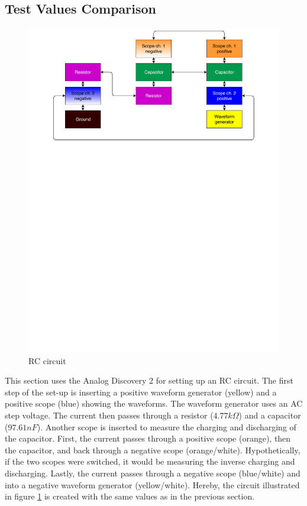 \subsection{Test Values Comparison}
\begin{figure}[H]
	\center
		\includegraphics[clip, trim=0cm 18cm 0cm 0cm, scale=0.6]{fig/img/test_circuit_1}
	\caption{RC circuit}
	\label{rc_flow}
\end{figure}
This section uses the Analog Discovery 2 for setting up an RC circuit. The first step of the set-up is inserting a positive waveform generator (yellow) and a positive scope (blue) showing the waveforms. The waveform generator uses an AC step voltage. The current then passes through a resistor ($4.77 k\Omega$) and a capacitor ($97.61 nF$). Another scope is inserted to measure the charging and discharging of the capacitor. First, the current passes through a positive scope (orange), then the capacitor, and back through a negative scope (orange/white). Hypothetically, if the two scopes were switched, it would be measuring the inverse charging and discharging. Lastly, the current passes through a negative scope (blue/white) and into a negative waveform generator (yellow/white). Hereby, the circuit illustrated in figure \ref{rc_flow} is created with the same values as in the previous section. \\ \\
